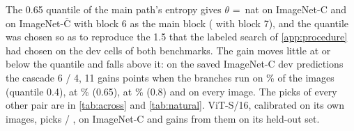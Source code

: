 \documentclass{article}
\begin{document}
The 0.65 quantile of the main path's entropy gives $\theta$ = \,nat on ImageNet-C and  on ImageNet-$\overline{\text{C}}$ with block 6 as the main block ( with block 7), and the quantile was chosen so as to reproduce the 1.5 that the labeled search of \cref{app:procedure} had chosen on the dev cells of both benchmarks. The gain moves little at or below the quantile and falls above it: on the saved ImageNet-C dev predictions the cascade 6 / 4, 11 gains  points when the branches run on \% of the images (quantile 0.4),  at \% (0.65),  at \% (0.8) and  on every image. The picks of every other pair are in \cref{tab:across} and \cref{tab:natural}. ViT-S/16, calibrated on its own images, picks  / ,  on ImageNet-C and gains  from them on its held-out set.
\end{document}
